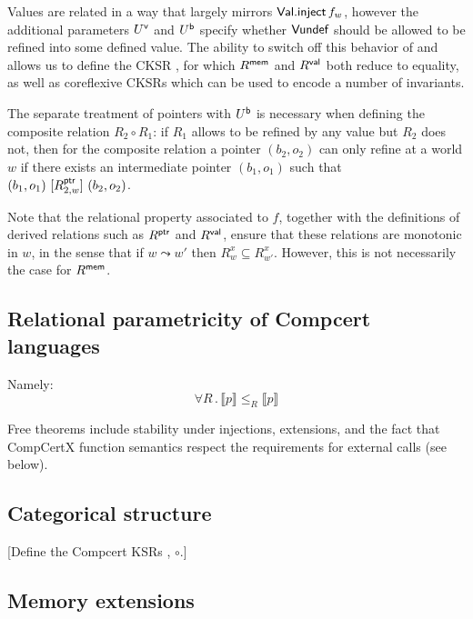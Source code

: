 Values are related in a way that largely mirrors $ \textsf{Val.inject} \,f_w$,
however the additional parameters $U^{ \textsf{v} }$ and $U^{ \textsf{b} }$
specify whether $ \textsf{Vundef} $ should be allowed to be refined
into some defined value.
The ability to switch off this behavior of  and 
allows us to define the CKSR ,
for which $R^{ \textsf{mem} }$ and $R^{ \textsf{val} }$ both reduce to equality,
as well as coreflexive CKSRs
which can be used to encode a number of invariants.

The separate treatment of pointers with $U^{ \textsf{b} }$
is necessary when defining the composite relation $R_2 \circ R_1$:
if $R_1$ allows  to be refined by any value
but $R_2$ does not,
then for the composite relation
a pointer $(b_2, o_2)$ can only refine  at a world $w$
if there exists an intermediate pointer $(b_1, o_1)$
such that $(b_1, o_1) \ [{R_{2,w}^{ \textsf{ptr} }}]\  (b_2, o_2)$.

Note that the relational property associated to $f$,
together with the definitions of
derived relations such as $R^{ \textsf{ptr} }$ and $R^{ \textsf{val} }$,
ensure that these relations are monotonic in $w$,
in the sense that if $w \leadsto w'$
then $R^x_w \subseteq R^x_{w'}$.
However,
this is not necessarily the case for $R^{ \textsf{mem} }$.


\subsection{Relational parametricity of Compcert languages} %

Namely:
\[ \forall R \,.\, \llbracket p \rrbracket \le_R \llbracket p \rrbracket \]

Free theorems include
stability under injections, extensions,
and the fact that CompCertX function semantics
respect the requirements for external calls (see below).


\subsection{Categorical structure} %

[Define the Compcert KSRs , $\circ$.]


\subsection{Memory extensions} %

